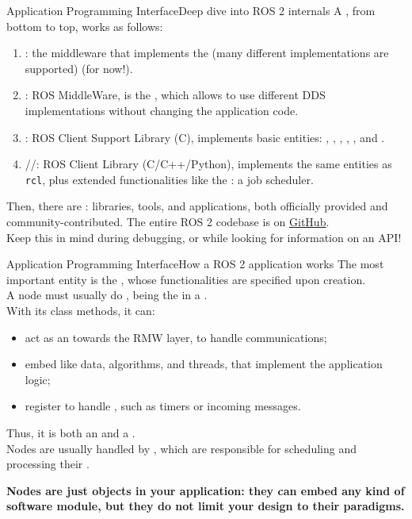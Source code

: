 \begin{frame}{Application Programming Interface}{Deep dive into ROS 2 internals}
	A , from bottom to top, works as follows:
	\begin{enumerate}
		\item {}: the middleware that implements the  (many different implementations are supported) (for now!).
		\item {}: ROS MiddleWare, is the , which allows to use different DDS implementations without changing the application code.
		\item {}: ROS Client Support Library (C), implements basic entities: , , , , , and .
		\item {}//: ROS Client Library (C/C++/Python), implements the same entities as \texttt{rcl}, plus extended functionalities like the : a job scheduler.
	\end{enumerate}
	Then, there are : libraries, tools, and applications, both officially provided and community-contributed. The entire ROS 2 codebase is on \href{https://github.com/ros2}{\color{blue}\underline{GitHub}}.\\
  Keep this in mind during debugging, or while looking for information on an API!
\end{frame}
\begin{frame}{Application Programming Interface}{How a ROS 2 application works}
	The most important entity is the , whose functionalities are specified upon creation.\\
	A node must usually do , being the  in a .\\
	With its class methods, it can:
	\begin{itemize}
		\item act as an  towards the RMW layer, to handle communications;
		\item embed  like data, algorithms, and threads, that implement the application logic;
		\item register  to handle , such as timers or incoming messages.
	\end{itemize}
	Thus, it is both an  and a .\\
	Nodes are usually handled by , which are responsible for scheduling and processing their .
	\begin{block}{}
		\centering
		\textbf{Nodes are just objects in your application: they can embed any kind of software module, but they do not limit your design to their paradigms.}
	\end{block}
\end{frame}

